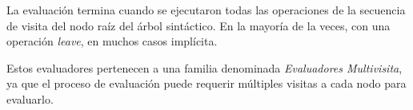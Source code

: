 \documentclass[runningheads,a4paper]{llncs}
\newcommand{\maggen}{\textbf{magGen}}
\begin{document}


La evaluación termina cuando se ejecutaron todas las operaciones de la secuencia de visita del nodo raíz del árbol sintáctico. En la mayoría de la veces, con una operación \emph{leave}, en muchos casos implícita.

Estos evaluadores pertenecen a una familia denominada \emph{Evaluadores Multivisita}, ya que el proceso de evaluación puede requerir múltiples visitas a cada nodo para evaluarlo.



% 
% 
\end{document}
